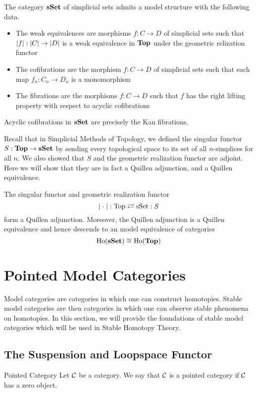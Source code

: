 \documentclass[a4paper]{article}
\begin{document}
\begin{thm}{}{} The category $\bold{sSet}$ of simplicial sets admits a model structure with the following data. 
\begin{itemize}
\item The weak equivalences are morphisms $f:C\to D$ of simplicial sets such that $\abs{f}:\abs{C}\to\abs{D}$ is a weak equivalence in $\bold{Top}$ under the geometric relization functor
\item The cofibrations are the morphism $f:C\to D$ of simplicial sets such that each map $f_n:C_n\to D_n$ is a monomorphism
\item The fibrations are the morphisms $f:C\to D$ such that $f$ has the right lifting property with respect to acyclic cofibrations
\end{itemize}
\end{thm}

\begin{lmm}{}{} Acyclic cofibrations in $\bold{sSet}$ are precisely the Kan fibrations. 
\end{lmm}

Recall that in Simplicial Methods of Topology, we defined the singular functor $S:\bold{Top}\to\bold{sSet}$ by sending every topological space to its set of all $n$-simplices for all $n$. We also showed that $S$ and the geometric realization functor are adjoint. Here we will show that they are in fact a Quillen adjunction, and a Quillen equivalence. 

\begin{thm}{}{} The singular functor and geometric realization functor $$\abs{\;\cdot\;}:\text{Top}\rightleftarrows\text{sSet}:S$$ form a Quillen adjunction. Moreover, the Quillen adjunction is a Quillen equivalence and hence descends to an model equivalence of categories $$\text{Ho}(\bold{sSet})\cong\text{Ho}(\bold{Top})$$
\end{thm}

\pagebreak
\section{Pointed Model Categories}
Model categories are categories in which one can construct homotopies. Stable model categories are then categories in which one can observe stable phenomena on homotopies. In this section, we will provide the foundations of stable model categories which will be used in Stable Homotopy Theory. 

\subsection{The Suspension and Loopspace Functor}
\begin{defn}{Pointed Category}{} Let $\mathcal{C}$ be a category. We say that $\mathcal{C}$ is a pointed category if $\mathcal{C}$ has a zero object. 
\end{defn}
\end{document}
